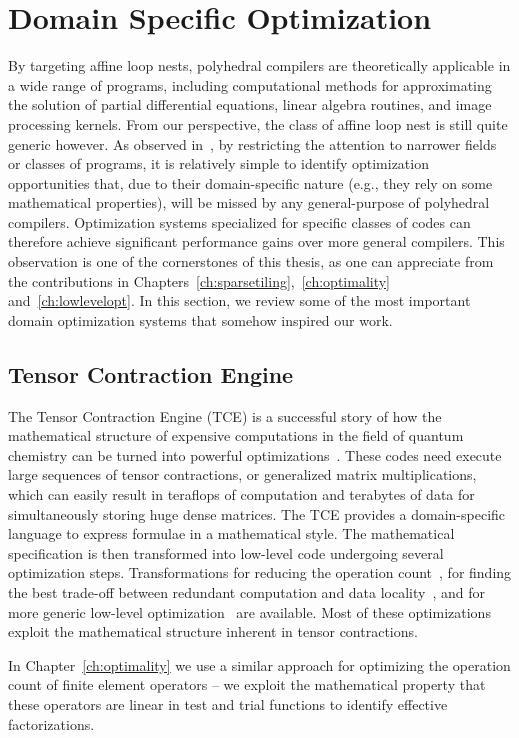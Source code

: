 \section{Domain Specific Optimization}
By targeting affine loop nests, polyhedral compilers are theoretically applicable in a wide range of programs, including computational methods for approximating the solution of partial differential equations, linear algebra routines, and image processing kernels. From our perspective, the class of affine loop nest is still quite generic however. As observed in~\cite{armin-poly-usability}, by restricting the attention to narrower fields or classes of programs, it is relatively simple to identify optimization opportunities that, due to their domain-specific nature (e.g., they rely on some mathematical properties), will be missed by any general-purpose of polyhedral compilers. Optimization systems specialized for specific classes of codes can therefore achieve significant performance gains over more general compilers. This observation is one of the cornerstones of this thesis, as one can appreciate from the contributions in Chapters~\ref{ch:sparsetiling},~\ref{ch:optimality} and~\ref{ch:lowlevelopt}. In this section, we review some of the most important domain optimization systems that somehow inspired our work. 

\subsection{Tensor Contraction Engine}
The Tensor Contraction Engine (TCE) is a successful story of how the mathematical structure of expensive computations in the field of quantum chemistry can be turned into powerful optimizations~\cite{TCE-url}. These codes need execute large sequences of tensor contractions, or generalized matrix multiplications, which can easily result in teraflops of computation and terabytes of data for simultaneously storing huge dense matrices. The TCE provides a domain-specific language to express formulae in a mathematical style. The mathematical specification is then transformed into low-level code undergoing several optimization steps. Transformations for reducing the operation count~\cite{TCE-2006,TCE-2009}, for finding the best trade-off between redundant computation and data locality~\cite{TCE-2011,TCE-2013}, and for more generic low-level optimization~\cite{TCE-2012} are available. Most of these optimizations exploit the mathematical structure inherent in tensor contractions. 

In Chapter~\ref{ch:optimality} we use a similar approach for optimizing the operation count of finite element operators -- we exploit the mathematical property that these operators are linear in test and trial functions to identify effective factorizations.


